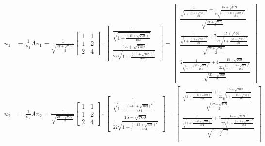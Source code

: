 \documentclass[a4paper, spanish]{article}
\begin{document}
    \begin{align}
      u_1 &=
      \frac{1}{\sigma_1}Av_1 =
      \frac{1}{\sqrt{\frac{27 + \sqrt{709}}{2}}}
      \begin{bmatrix}
        1 & 1\\
        1 & 2\\
        2 & 4
      \end{bmatrix}
      \cdot
      \begin{bmatrix}
        \frac{1}{\sqrt{1 + \frac{(15 + \sqrt{709})^2}{484}}} \\
        \frac{15 + \sqrt{709}}{22\sqrt{1 + \frac{(15 + \sqrt{709})^2}{484}}}
      \end{bmatrix}
      =
      \begin{bmatrix}
          \frac{\frac{1}{\sqrt{1 + \frac{(15 + \sqrt{709})^2}{484}}} +
          \frac{15 + \sqrt{709}}{22\sqrt{1 + \frac{(15 + \sqrt{709})^2}{484}}}}{\sqrt{\frac{27 + \sqrt{709}}{2}}} \\
          \frac{\frac{1}{\sqrt{1 + \frac{(15 + \sqrt{709})^2}{484}}} +2
          \frac{15 + \sqrt{709}}{22\sqrt{1 + \frac{(15 + \sqrt{709})^2}{484}}}}{\sqrt{\frac{27 + \sqrt{709}}{2}}} \\
          \frac{2\frac{1}{\sqrt{1 + \frac{(15 + \sqrt{709})^2}{484}}} +4
          \frac{15 + \sqrt{709}}{22\sqrt{1 + \frac{(15 + \sqrt{709})^2}{484}}}}{\sqrt{\frac{27 + \sqrt{709}}{2}}}
      \end{bmatrix} \\
      u_2 &=
      \frac{1}{\sigma_2}Av_2 =
      \frac{1}{\sqrt{\frac{27 - \sqrt{709}}{2}}}
      \begin{bmatrix}
        1 & 1\\
        1 & 2\\
        2 & 4
      \end{bmatrix}
      \cdot
      \begin{bmatrix}
        \frac{1}{\sqrt{1 + \frac{(- 15 + \sqrt{709})^2}{484}}} \\
        \frac{15 - \sqrt{709}}{22\sqrt{1 + \frac{(- 15 + \sqrt{709})^2}{484}}}
      \end{bmatrix}
      =
      \begin{bmatrix}
        \frac{\frac{1}{\sqrt{1 + \frac{(- 15 + \sqrt{709})^2}{484}}} + \frac{15 - \sqrt{709}}{22\sqrt{1 + \frac{(- 15 + \sqrt{709})^2}{484}}}}{\sqrt{\frac{27 - \sqrt{709}}{2}}} \\
        \frac{\frac{1}{\sqrt{1 + \frac{(- 15 + \sqrt{709})^2}{484}}} + 2
        \frac{15 - \sqrt{709}}{22\sqrt{1 + \frac{(- 15 + \sqrt{709})^2}{484}}}}{\sqrt{\frac{27 - \sqrt{709}}{2}}} \\

\end{bmatrix}
\end{align}
\end{document}
